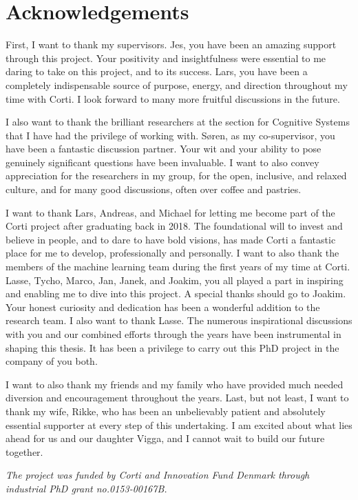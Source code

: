 
\chapter[acknowledgements]{Acknowledgements}
First, I want to thank my supervisors. Jes, you have been an amazing support through this project. 
Your positivity and insightfulness were essential to me daring to take on this project, and to its success. 
Lars, you have been a completely indispensable source of purpose, energy, and direction throughout my time with Corti. I look forward to many more fruitful discussions in the future.

I also want to thank the brilliant researchers at the section for Cognitive Systems that I have had the privilege of working with. 
Søren, as my co-supervisor, you have been a fantastic discussion partner. Your wit and your ability to pose genuinely significant questions have been invaluable. 
I want to also convey appreciation for the researchers in my group, for the open, inclusive, and relaxed culture, and for many good discussions, often over coffee and pastries.

I want to thank Lars, Andreas, and Michael for letting me become part of the Corti project after graduating back in 2018. 
The foundational will to invest and believe in people, and to dare to have bold visions, has made Corti a fantastic place for me to develop, professionally and personally. 
I want to also thank the members of the machine learning team during the first years of my time at Corti. Lasse, Tycho, Marco, Jan, Janek, and Joakim, you all played a part in inspiring and enabling me to dive into this project. 
A special thanks should go to Joakim. Your honest curiosity and dedication has been a wonderful addition to the research team. 
I also want to thank Lasse. The numerous inspirational discussions with you and our combined efforts through the years have been instrumental in shaping this thesis. It has been a privilege to carry out this PhD project in the company of you both. 

I want to also thank my friends and my family who have provided much needed diversion and encouragement throughout the years. 
Last, but not least, I want to thank my wife, Rikke, who has been an unbelievably patient and absolutely essential supporter at every step of this undertaking. I am excited about what lies ahead for us and our daughter Vigga, and I cannot wait to build our future together. 

\vspace*{\fill}
\noindent \textit{The project was funded by Corti and Innovation Fund Denmark through industrial PhD grant no.\@ 0153-00167B.}

